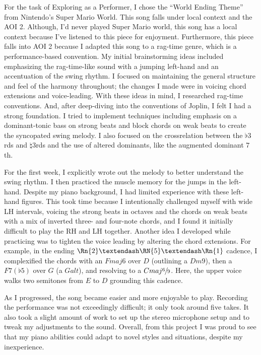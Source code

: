 \documentclass[12pt]{article}
\begin{document}
For the task of Exploring as a Performer, I chose the “World Ending Theme” from Nintendo's Super Mario World. This song falls under local context and the AOI 2. Although, I'd never played Super Mario world, this song has a local context because I've listened to this piece for enjoyment. Furthermore, this piece falls into AOI 2 because I adapted this song to a rag-time genre, which is a performance-based convention. 
My initial brainstorming ideas included emphasizing the rag-time-like sound with a jumping left-hand and an accentuation of the swing rhythm. I focused on maintaining the general structure and feel of the harmony throughout; the changes I made were in voicing chord extensions and voice-leading. With these ideas in mind, I researched rag-time conventions. And, after deep-diving into the conventions of Joplin, I felt I had a strong foundation. I tried to implement techniques including emphasis on a dominant-tonic bass on strong beats and block chords on weak beats to create the syncopated swing melody. I also focused on the crossrelation between the $\flat 3$rds and $\natural 3$rds and the use of altered dominants, like the augmented dominant $7$th.
 
For the first week, I explicitly wrote out the melody to better understand the swing rhythm. I then practiced the muscle memory for the jumps in the left-hand. Despite my piano background, I had limited experience with these left-hand figures. This took time because I intentionally challenged myself with wide LH intervals, voicing the strong beats in octaves and the chords on weak beats with a mix of inverted three- and four-note chords, and I found it initially difficult to play the RH and LH together. Another idea I developed while practicing was to tighten the voice leading by altering the chord extensions. For example, in the ending $\Rn{2}–\RN{5}–\Rn{1}$ cadence, I complexified the chords with an $Fmaj6$ over $D$ (outlining a $Dm9$), then a $F7(\flat 5)$ over $G$ (a $Galt$), and resolving to a $Cmaj\sfrac{6}{9}$. Here, the upper voice walks two semitones from $E$ to $D$ grounding this cadence. 
 
As I progressed, the song became easier and more enjoyable to play. Recording the performance was not exceedingly difficult; it only took around five takes. It also took a slight amount of work to set up the stereo microphone setup and to tweak my adjustments to the sound. Overall, from this project I was proud to see that my piano abilities could adapt to novel styles and situations, despite my inexperience.
\end{document}
